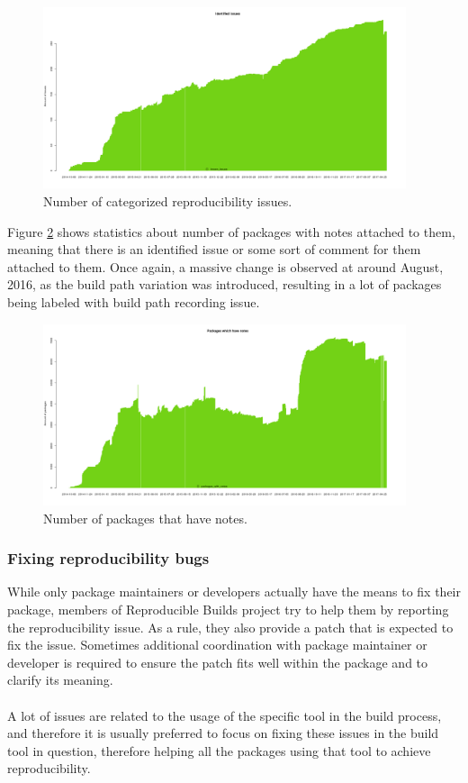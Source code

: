 {\begin{figure}
\centering
\includegraphics[width=0.95\textwidth]{fig/stats_issues.png}
\caption{\label{fig:stats_issues}Number of categorized reproducibility issues.}
\end{figure}

Figure \ref{fig:stats_notes} shows statistics about number of packages with notes attached to them, meaning that there is an identified issue or some sort of comment for them attached to them. Once again, a massive change is observed at around August, 2016, as the build path variation was introduced, resulting in a lot of packages being labeled with build path recording issue.\\

\begin{figure}
\centering
\includegraphics[width=0.95\textwidth]{fig/stats_notes.png}
\caption{\label{fig:stats_notes}Number of packages that have notes.}
\end{figure}
\subsubsection[Fixing reproducibility bugs]{Fixing reproducibility bugs}
While only package maintainers or developers actually have the means to fix their package, members of Reproducible Builds project try to help them by reporting the reproducibility issue. As a rule, they also provide a patch that is expected to fix the issue. Sometimes additional coordination with package maintainer or developer is required to ensure the patch fits well within the package and to clarify its meaning.\\\\
A lot of issues are related to the usage of the specific tool in the build process, and therefore it is usually preferred to focus on fixing these issues in the build tool in question, therefore helping all the packages using that tool to achieve reproducibility.

}
